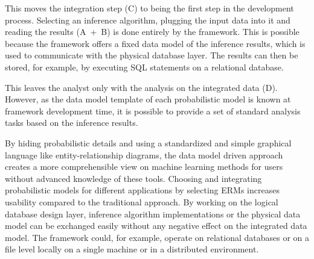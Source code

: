 \newpage

This moves the integration step (C) to being the first step in the development process. Selecting an inference algorithm, plugging the input data into it and reading the results (A~+~B) is done entirely by the framework. This is possible because the framework offers a fixed data model of the inference results, which is used to communicate with the physical database layer. The results can then be stored, for example, by executing SQL statements on a relational database.

This leaves the analyst only with the analysis on the integrated data (D). However, as the data model template of each probabilistic model is known at framework development time, it is possible to provide a set of standard analysis tasks based on the inference results.

By hiding probabilistic details and using a standardized and simple graphical language like entity-relationship diagrams, the data model driven approach creates a more comprehensible view on machine learning methods for users without advanced knowledge of these tools. Choosing and integrating probabilistic models for different applications by selecting ERMs increases usability compared to the traditional approach. By working on the logical database design layer, inference algorithm implementations or the physical data model can be exchanged easily without any negative effect on the integrated data model. The framework could, for example, operate on relational databases or on a file level locally on a single machine or in a distributed environment.
